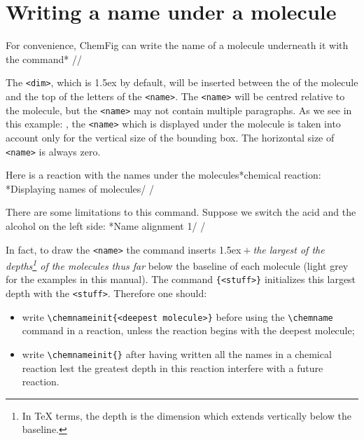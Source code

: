 \documentclass[10pt]{article}
\makeatletter
\newcommand\idx{\@ifstar{\let\print@or@not\@gobble\idx@}{\let\print@or@not\@firstofone\idx@}}
\newcommand\idx@[1]{%
	\ifcat\expandafter\noexpand\@car#1\@nil\relax%
		\expandafter\ifx\@car#1\@nil\protect
			\index{#1}%
			\print@or@not{#1}%
		\else
			\saveexpandmode\expandarg
			\StrSubstitute{\string#1}{\string @}{\@empty\protect\symbol{'100}}[\temp@]%
			\StrGobbleLeft\temp@1[\temp@]%
			\restoreexpandmode
			\expandafter\index\expandafter{\temp@ @\protect\texttt{\protect\textbackslash\temp@}}%
			\print@or@not{\texttt{\string#1}}%
		\fi
	\else
		\index{#1}%
		\print@or@not{#1}%
	\fi
}
\newcommand\make@car@active[2]{%
	\catcode`#1\active
	\begingroup
		\lccode`\~`#1\relax
		\lowercase{\endgroup\def~{#2}}%
}
\newif\if@exstar
\newcommand\exemple{%
	\begingroup
	\parskip\z@
	\@makeother\;\@makeother\!\@makeother\?\@makeother\:%
	\@ifstar{\@exstartrue\exemple@}{\@exstarfalse\exemple@}}
\newcommand\exemple@[2][65]{%
	\medbreak\noindent
	\begingroup
		\let\do\@makeother\dospecials
		\make@car@active\ { {}}%
		\make@car@active\^^M{\par\leavevmode}%
		\make@car@active\,{\leavevmode\kern\z@\string,}%
		\make@car@active\-{\leavevmode\kern\z@\string-}%
		\make@car@active\>{\leavevmode\kern\z@\string>}%
		\make@car@active\<{\leavevmode\kern\z@\string<}%
		\exemple@@{#1}{#2}%
}
\newcommand\exemple@@[3]{%
	\def\@tempa##1#3{\exemple@@@{#1}{#2}{##1}}%
	\@tempa
}
\newcommand\exemple@@@[3]{%
	\xdef\the@code{#3}%
	\endgroup
	\if@exstar
		\begingroup
			\fboxrule0.4pt
			\let\breakboxparindent\z@
			\def\bkvz@bottom{\hrule\@height\fboxrule}%
			\let\bkvz@before@breakbox\relax
			\def\bkvz@set@linewidth{\advance\linewidth\dimexpr-2\fboxrule-2\fboxsep}%
			\def\bkvz@left{\vrule\@width\fboxrule\hskip\fboxsep}%
			\def\bkvz@right{\hskip\fboxsep\vrule\@width\fboxrule}%
			\def\bkvz@top{\hbox to \hsize{%
				\vrule\@width\fboxrule\@height\fboxrule
				\leaders\bkvz@bottom\hfill
				\ECFAugie
				\fboxsep\z@
				\colorbox{black}{\kern0.25em\color{white}\footnotesize\lower0.5ex\hbox{\strut#2}\kern0.25em}%
				\leaders\bkvz@bottom\hfill
				\vrule\@width\fboxrule\@height\fboxrule}}%
			\breakbox
				\kern.5ex\relax
				\ttfamily\footnotesize\the@code\par
				\normalfont
				\kern3pt
				\hrule height0.1pt width\linewidth depth0.1pt
				\vskip5pt
				\rightskip0pt plus 1fill
				\everypar{{\color{lightgray}\rlap{\vrule height0.1pt width\linewidth depth0.1pt}}\hskip0pt plus 1fill}%
				\newlinechar`\^^M\everyeof{\noexpand}\scantokens{#3}\par
			\endbreakbox
		\endgroup
	\else
		\vskip0.5ex
		\boxput*(0,1)
			{\fboxsep\z@
			\hbox{\ECFAugie\colorbox{black}{\leavevmode\kern0.25em{\color{white}\footnotesize\strut#2}\kern0.25em}}%
			}%
			{\fboxsep5pt
			\fbox{%
				$\vcenter{\hsize\dimexpr0.#1\linewidth-\fboxsep-\fboxrule\relax
					\kern5pt\parskip0pt \ttfamily\footnotesize\the@code}%
				\vcenter{\kern5pt\hsize\dimexpr\linewidth-0.#1\linewidth-\fboxsep-\fboxrule\relax
					\everypar{{\color{lightgray}\rlap{\vrule height0.1pt width\dimexpr\linewidth-0.#1\linewidth-\fboxsep-\fboxrule depth0.1pt}}}%
					\footnotesize\newlinechar`\^^M\everyeof{\noexpand}\scantokens{#3}}$%
				}%
			}%
	\fi
	\medbreak
	\endgroup
}
\let\do\@makeother\dospecials
\newcommand\CF{{\ECFAugie ChemFig}\xspace}
\makeatother
\begin{document}
\section{Writing a name under a molecule}\label{chemname}
For convenience, \CF can write the name of a molecule underneath it with the command\idx*\chemname
\centerverb//
\smallskip

The \verb-<dim>-, which is 1.5ex by default, will be inserted between the \idx{baseline} of the molecule and the top of the letters of the \verb-<name>-. The \verb-<name>- will be centred relative to the molecule, but the \verb-<name>- may not contain multiple paragraphs. As we see in this example: , the \verb-<name>- which is displayed under the molecule is taken into account only for the vertical size of the bounding box. The horizontal size of \verb-<name>- is always zero.

Here is a reaction with the names under the molecules\idx*{chemical reaction}:
\exemple*{Displaying names of molecules}/
\chemsign{+}
\chemrel{->}
\chemsign{+}
/

There are some limitations to this command. Suppose we switch the acid and the alcohol on the left side:
\exemple*{Name alignment 1}/
\chemsign{+}
\chemrel{->}
\chemsign{+}
/

In fact, to draw the \verb-<name>- the command \idx{\chemname} inserts 1.5ex${}+{}$\emph{the largest of the depths\footnote{In \TeX{} terms, the depth is the dimension which extends vertically below the baseline.} of the molecules thus far} below the baseline of each molecule (light grey for the examples in this manual). The command \idx{\chenameinit}\verb-{<stuff>}- initializes this largest depth with the \verb-<stuff>-. Therefore one should:
\begin{itemize}
	\item write \verb-\chemnameinit{<deepest molecule>}- before using the \verb-\chemname- command in a reaction, unless the reaction begins with the deepest molecule;
	\item write \verb-\chemnameinit{}- after having written all the names in a chemical reaction lest the greatest depth in this reaction interfere with a future reaction.
\end{itemize}
\end{document}
